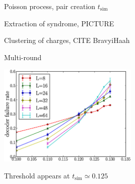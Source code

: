 \documentclass[12pt,a4paper]{article}
\begin{document}


Poisson process, pair creation $t_{\mathrm{sim}}$

Extraction of syndrome, PICTURE

Clustering of charges, CITE BravyiHaah

Multi-round




\begin{center}
\includegraphics[width=0.5\textwidth]{threshold-graph.eps}
\end{center}

Threshold appears at $t_{\mathrm{sim}}\simeq 0.125$






%
\end{document}
